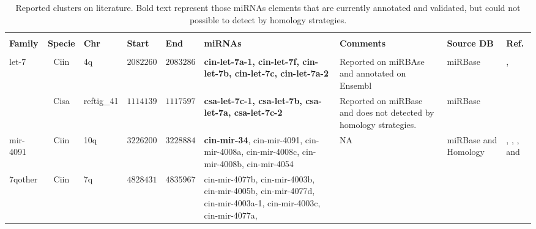 \documentclass[graybox]{svmult}
\begin{document}

\begin{small}
\begin{center}
\begin{longtable}{lclllp{2.5cm}p{3cm}p{2.5cm}p{1cm}}
\tabularnewline
\caption{Reported clusters on literature. Bold text represent those miRNAs 
elements that are currently annotated and validated, but could not 
possible to detect by homology strategies.} %
\label{tab:otherClusters}
\tabularnewline
\cline{1-9}
\textbf{Family} & \textbf{Specie} & \textbf{Chr} & \textbf{Start} & \textbf{End} 
& \textbf{miRNAs} & \textbf{Comments} & \textbf{Source DB} & 
\textbf{Ref.}\\
\tabularnewline
\cline{1-9}
\multirow{2}{*}{let-7} & Ciin & 4q & $2082260$ & $2083286$ & 
\textbf{cin-let-7a-1, cin-let-7f, cin-let-7b, cin-let-7c, cin-let-7a-2} & 
Reported on miRBAse and annotated on Ensembl & miRBase & \cite{Hendrix2010}, 
\cite{Fu2008} \\
 & Cisa & reftig\_41 & $1114139$ & $1117597$ & \textbf{csa-let-7c-1, 
csa-let-7b, csa-let-7a, csa-let-7c-2} & Reported on miRBase and does not 
detected by homology strategies. & miRBase & \cite{Fu2008} \\
\hline
mir-4091 & Ciin & 10q & $3226200$ & $3228884$ & \textbf{cin-mir-34}, 
cin-mir-4091, cin-mir-4008a, cin-mir-4008c, cin-mir-4008b, cin-mir-4054 & NA & 
miRBase and Homology & \cite{Norden-Krichmar2007}, \cite{Fu2008}, 
\cite{Hendrix2010}, and \cite{Terai2012}\\
\hline
7qother & Ciin & 7q & $4828431$ & $4835967$ & cin-mir-4077b, cin-mir-4003b, 
cin-mir-4005b, cin-mir-4077d, cin-mir-4003a-1, cin-mir-4003c, cin-mir-4077a, 

\end{longtable}
\end{center}
\end{small}
\end{document}
